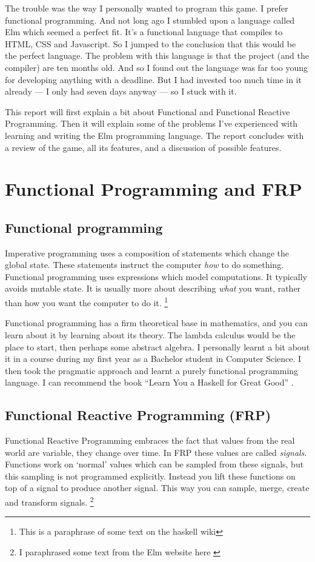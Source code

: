 \documentclass[a4paper]{article}
\begin{document}
The trouble was the way I personally wanted to program this game. I prefer
 functional programming. And not long ago I stumbled upon a language called Elm
 which seemed a perfect fit. It's a functional language that compiles to HTML,
 CSS and Javascript. So I jumped to the conclusion that this would be the
 perfect language. The problem with this language is that the project (and the
 compiler) are ten months old. And so I found out the language was far too young
 for developing anything with a deadline. But I had invested too much time in it
 already --- I only had seven days anyway --- so I stuck with it. 

This report will first explain a bit about Functional and Functional Reactive
 Programming. Then it will explain some of the problems I've experienced with
 learning and writing the Elm programming language. The report concludes with a
 review of the game, all its features, and a discussion of possible features.

\section{Functional Programming and FRP}

\subsection{Functional programming}
Imperative programming uses a composition of statements which change the global
 state. These statements instruct the computer \textit{how} to do something. \\
Functional programming uses expressions which model computations. It typically
 avoids mutable state. It is usually more about describing \textit{what} you
 want, rather than how you want the computer to do it. \footnote{This is a
 paraphrase of some text on the haskell wiki\cite{site:haskell-wiki-fp}}

Functional programming has a firm theoretical base in mathematics, and you can
 learn about it by learning about its theory. The lambda calculus would be the
 place to start, then perhaps some abstract algebra. I personally learnt a bit
 about it in a course during my first year as a Bachelor student in Computer
 Science. I then took the pragmatic approach and learnt a purely functional
 programming language. I can recommend the book ``Learn You a Haskell for Great
 Good'' \cite{book:LYaH}.

\subsection{Functional Reactive Programming (FRP)}
Functional Reactive Programming embraces the fact that values from the real
 world are variable, they change over time. In FRP these values are called
 \textit{signals}. Functions work on `normal' values which can be sampled from
 these signals, but this sampling is not programmed explicitly. Instead you
 lift these functions on top of a signal to produce another signal. This way you
 can sample, merge, create and transform signals. \footnote{I paraphrased some
 text from the Elm website here \cite{site:elm-frp}}
\end{document}
